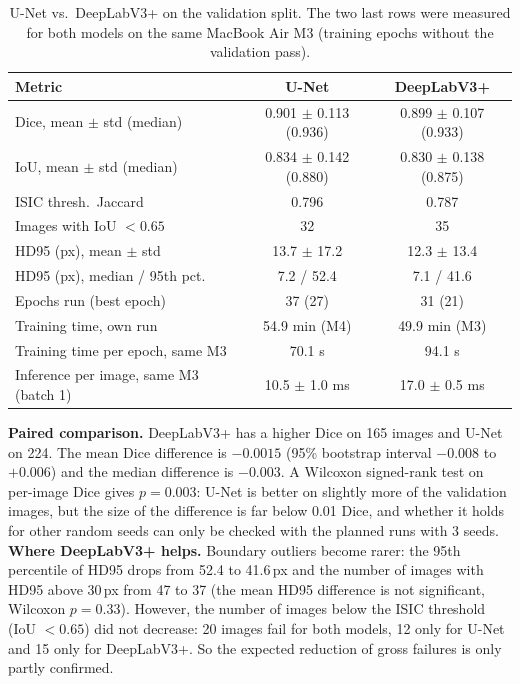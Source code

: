 \documentclass[11pt,a4paper]{article}
\begin{document}
\begin{table}[htbp]
\centering
\begin{tabular}{lcc}
\toprule
\textbf{Metric} & \textbf{U-Net} & \textbf{DeepLabV3+} \\
\midrule
Dice, mean $\pm$ std (median) & 0.901 $\pm$ 0.113 (0.936) & 0.899 $\pm$ 0.107 (0.933) \\
IoU, mean $\pm$ std (median) & 0.834 $\pm$ 0.142 (0.880) & 0.830 $\pm$ 0.138 (0.875) \\
ISIC thresh.\ Jaccard & 0.796 & 0.787 \\
Images with IoU $<0.65$ & 32 & 35 \\
HD95 (px), mean $\pm$ std & 13.7 $\pm$ 17.2 & 12.3 $\pm$ 13.4 \\
HD95 (px), median / 95th pct. & 7.2 / 52.4 & 7.1 / 41.6 \\
\midrule
Epochs run (best epoch) & 37 (27) & 31 (21) \\
Training time, own run & 54.9 min (M4) & 49.9 min (M3) \\
Training time per epoch, same M3 & 70.1 s & 94.1 s \\
Inference per image, same M3 (batch 1) & 10.5 $\pm$ 1.0 ms & 17.0 $\pm$ 0.5 ms \\
\bottomrule
\end{tabular}
\caption{U-Net vs.\ DeepLabV3+ on the validation split. The two last rows were measured for both
models on the same MacBook Air M3 (training epochs without the validation pass).}
\label{tab:results}
\end{table}

\textbf{Paired comparison.} DeepLabV3+ has a higher Dice on 165 images and U-Net on 224. The mean
Dice difference is $-0.0015$ (95\% bootstrap interval $-0.008$ to $+0.006$) and the median
difference is $-0.003$. A Wilcoxon signed-rank test on per-image Dice gives $p = 0.003$: U-Net is
better on slightly more of the validation images, but the size of the difference is far below
0.01 Dice, and whether it holds for other random seeds can only be checked with the planned runs
with 3 seeds.
\textbf{Where DeepLabV3+ helps.} Boundary outliers become rarer: the 95th percentile of HD95 drops
from 52.4 to 41.6\,px and the number of images with HD95 above 30\,px from 47 to 37 (the mean
HD95 difference is not significant, Wilcoxon $p = 0.33$). However, the number of images below the
ISIC threshold (IoU $<0.65$) did not decrease: 20 images fail for both models, 12 only for U-Net and
15 only for DeepLabV3+. So the expected reduction of gross failures is only partly confirmed.
\end{document}
